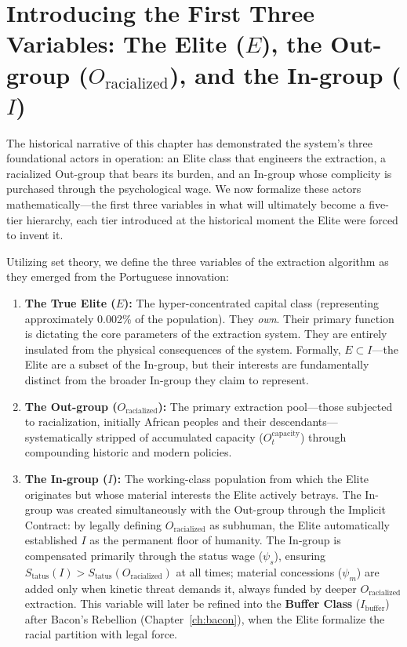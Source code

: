 \section{Introducing the First Three Variables: The Elite ($E$), the Out-group ($O_{\text{racialized}}$), and the In-group ($I$)}

The historical narrative of this chapter has demonstrated the system's three foundational actors in operation: an Elite class that engineers the extraction, a racialized Out-group that bears its burden, and an In-group whose complicity is purchased through the psychological wage. We now formalize these actors mathematically---the first three variables in what will ultimately become a five-tier hierarchy, each tier introduced at the historical moment the Elite were forced to invent it.

Utilizing set theory, we define the three variables of the extraction algorithm as they emerged from the Portuguese innovation:

\begin{enumerate}
    \item \textbf{The True Elite ($E$):} The hyper-concentrated capital class (representing approximately 0.002\% of the population). They \textit{own}. Their primary function is dictating the core parameters of the extraction system. They are entirely insulated from the physical consequences of the system. Formally, $E \subset I$---the Elite are a subset of the In-group, but their interests are fundamentally distinct from the broader In-group they claim to represent.

    \item \textbf{The Out-group ($O_{\text{racialized}}$):} The primary extraction pool---those subjected to racialization, initially African peoples and their descendants---systematically stripped of accumulated capacity ($O_t^{\text{capacity}}$) through compounding historic and modern policies.

    \item \textbf{The In-group ($I$):} The working-class population from which the Elite originates but whose material interests the Elite actively betrays. The In-group was created simultaneously with the Out-group through the Implicit Contract: by legally defining $O_{\text{racialized}}$ as subhuman, the Elite automatically established $I$ as the permanent floor of humanity. The In-group is compensated primarily through the status wage ($\psi_s$), ensuring $S_{\text{tatus}}(I) > S_{\text{tatus}}(O_{\text{racialized}})$ at all times; material concessions ($\psi_m$) are added only when kinetic threat demands it, always funded by deeper $O_{\text{racialized}}$ extraction. This variable will later be refined into the \textbf{Buffer Class} ($I_{\text{buffer}}$) after Bacon's Rebellion (Chapter~\ref{ch:bacon}), when the Elite formalize the racial partition with legal force.
\end{enumerate}

